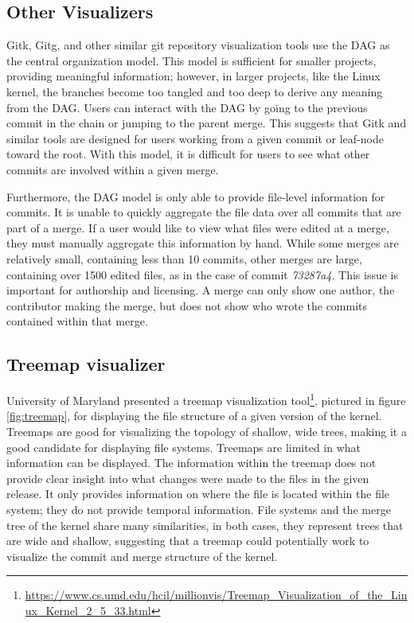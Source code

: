 \documentclass[conference, draftclsnofoot, draft]{IEEEtran}
\begin{document}
\subsection{Other Visualizers}

Gitk, Gitg, and other similar git repository visualization tools use the DAG as the
central organization model. This model is sufficient for smaller projects, providing
meaningful information; however, in larger projects, like the Linux kernel, the
branches become too tangled and too deep to derive any meaning from the DAG. Users
can interact with the DAG by going to the previous commit in the chain or jumping to
the parent merge. This suggests that Gitk and similar tools are designed for users
working from a given commit or leaf-node toward the root. With this model, it is
difficult for users to see what other commits are involved within a given merge.

Furthermore, the DAG model is only able to provide file-level information for
commits. It is unable to quickly aggregate the file data over all commits that
are part of a merge. If a user would like to view what files were edited at a merge,
they must manually aggregate this information by hand. While some merges are
relatively small, containing less than 10 commits, other merges are large,
containing over 1500 edited files, as in the case of commit \textit{73287a4}. This
issue is important for authorship and licensing. A merge can only show one author,
the contributor making the merge, but does not show who wrote the commits contained
within that merge.



\subsection{Treemap visualizer}

University of Maryland presented a treemap visualization
tool\footnote{\url{https://www.cs.umd.edu/hcil/millionvis/Treemap_Visualization_of_the_Linux_Kernel_2_5_33.html}},
pictured in figure \ref{fig:treemap}, for displaying the file structure of a given
version of the kernel. Treemaps are good for visualizing the topology of shallow,
wide trees, making it a good candidate for displaying file systems. Treemaps are
limited in what information can be displayed. The information within the treemap
does not provide clear insight into what changes were made to the files in the given
release. It only provides information on where the file is located within the file
system; they do not provide temporal information. File systems and the merge
tree of the kernel share many similarities, in both cases, they represent trees that
are wide and shallow, suggesting that a treemap could potentially work to visualize
the commit and merge structure of the kernel.
\end{document}
